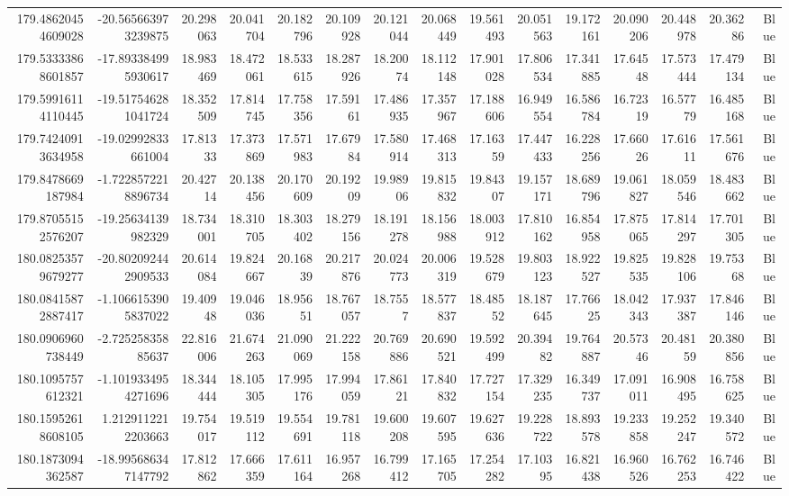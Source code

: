 \begin{center}
\begin{longtable}{rrrrrrrrrrrrrrr}
179.48620454609028 & -20.565663973239875 & 20.298063 & 20.041704 & 20.182796 & 20.109928 & 20.121044 & 20.068449 & 19.561493 & 20.051563 & 19.172161 & 20.090206 & 20.448978 & 20.36286 & Blue \\
179.53333868601857 & -17.893384995930617 & 18.983469 & 18.472061 & 18.533615 & 18.287926 & 18.20074 & 18.112148 & 17.901028 & 17.806534 & 17.341885 & 17.64548 & 17.573444 & 17.479134 & Blue \\
179.59916114110445 & -19.517546281041724 & 18.352509 & 17.814745 & 17.758356 & 17.59161 & 17.486935 & 17.357967 & 17.188606 & 16.949554 & 16.586784 & 16.72319 & 16.57779 & 16.485168 & Blue \\
179.74240913634958 & -19.02992833661004 & 17.81333 & 17.373869 & 17.571983 & 17.67984 & 17.580914 & 17.468313 & 17.16359 & 17.447433 & 16.228256 & 17.66026 & 17.61611 & 17.561676 & Blue \\
179.8478669187984 & -1.7228572218896734 & 20.42714 & 20.138456 & 20.170609 & 20.19209 & 19.98906 & 19.815832 & 19.84307 & 19.157171 & 18.689796 & 19.061827 & 18.059546 & 18.483662 & Blue \\
179.87055152576207 & -19.25634139982329 & 18.734001 & 18.310705 & 18.303402 & 18.279156 & 18.191278 & 18.156988 & 18.003912 & 17.810162 & 16.854958 & 17.875065 & 17.814297 & 17.701305 & Blue \\
180.08253579679277 & -20.802092442909533 & 20.614084 & 19.824667 & 20.16839 & 20.217876 & 20.024773 & 20.006319 & 19.528679 & 19.803123 & 18.922527 & 19.825535 & 19.828106 & 19.75368 & Blue \\
180.08415872887417 & -1.1066153905837022 & 19.40948 & 19.046036 & 18.95651 & 18.767057 & 18.7557 & 18.577837 & 18.48552 & 18.187645 & 17.76625 & 18.042343 & 17.937387 & 17.846146 & Blue \\
180.0906960738449 & -2.72525835885637 & 22.816006 & 21.674263 & 21.090069 & 21.222158 & 20.769886 & 20.690521 & 19.592499 & 20.39482 & 19.764887 & 20.57346 & 20.48159 & 20.380856 & Blue \\
180.1095757612321 & -1.1019334954271696 & 18.344444 & 18.105305 & 17.995176 & 17.994059 & 17.86121 & 17.840832 & 17.727154 & 17.329235 & 16.349737 & 17.091011 & 16.908495 & 16.758625 & Blue \\
180.15952618608105 & 1.2129112212203663 & 19.754017 & 19.519112 & 19.554691 & 19.781118 & 19.600208 & 19.607595 & 19.627636 & 19.228722 & 18.893578 & 19.233858 & 19.252247 & 19.340572 & Blue \\
180.1873094362587 & -18.995686347147792 & 17.812862 & 17.666359 & 17.611164 & 16.957268 & 16.799412 & 17.165705 & 17.254282 & 17.10395 & 16.821438 & 16.960526 & 16.762253 & 16.746422 & Blue \\

\end{longtable}
\end{center}
